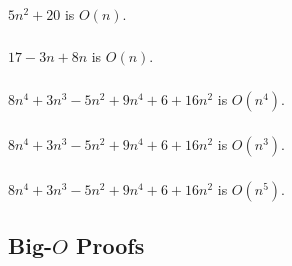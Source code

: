\documentclass{article}
\begin{document}
\subsubsection{}

$5n^2 + 20$ is $O(n)$.

\begin{mdframed}
\vspace{3em}
\end{mdframed}

\subsubsection{}

$17 - 3n + 8n$ is $O(n)$.

\begin{mdframed}
\vspace{3em}
\end{mdframed}

\subsubsection{}

$8n^4 + 3n^3 - 5n^2 + 9n^4 + 6 + 16n^2$ is $O(n^4)$.

\begin{mdframed}
\vspace{3em}
\end{mdframed}

\subsubsection{}

$8n^4 + 3n^3 - 5n^2 + 9n^4 + 6 + 16n^2$ is $O(n^3)$.

\begin{mdframed}
\vspace{3em}
\end{mdframed}

\subsubsection{}

$8n^4 + 3n^3 - 5n^2 + 9n^4 + 6 + 16n^2$ is $O(n^5)$.

\begin{mdframed}
\vspace{3em}
\end{mdframed}

\subsection{Big-$O$ Proofs}
\end{document}
